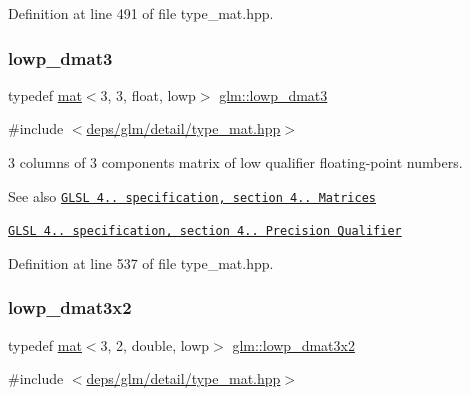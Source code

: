 Definition at line 491 of file type\+\_\+mat.\+hpp.

\mbox{\label{group__core__precision_ga2e700c380867b8d935f2c9ea40c9ca16}} 
\subsubsection{\texorpdfstring{lowp\+\_\+dmat3}{lowp\_dmat3}}
{\footnotesize\ttfamily typedef \hyperlink{structglm_1_1mat}{mat}$<$3, 3, float, lowp$>$ \hyperlink{group__core__precision_ga2e700c380867b8d935f2c9ea40c9ca16}{glm\+::lowp\+\_\+dmat3}}



{\ttfamily \#include $<$\hyperlink{type__mat_8hpp}{deps/glm/detail/type\+\_\+mat.\+hpp}$>$}

3 columns of 3 components matrix of low qualifier floating-\/point numbers.

\begin{DoxySeeAlso}{See also}
\href{http://www.opengl.org/registry/doc/GLSLangSpec.4.20.8.pdf}{\tt G\+L\+SL 4.. specification, section 4.. Matrices} 

\href{http://www.opengl.org/registry/doc/GLSLangSpec.4.20.8.pdf}{\tt G\+L\+SL 4.. specification, section 4.. Precision Qualifier} 
\end{DoxySeeAlso}


Definition at line 537 of file type\+\_\+mat.\+hpp.

\mbox{\label{group__core__precision_gae774d40dc418c39f5ef4dcf4deac0e3c}} 
\subsubsection{\texorpdfstring{lowp\+\_\+dmat3x2}{lowp\_dmat3x2}}
{\footnotesize\ttfamily typedef \hyperlink{structglm_1_1mat}{mat}$<$3, 2, double, lowp$>$ \hyperlink{group__core__precision_gae774d40dc418c39f5ef4dcf4deac0e3c}{glm\+::lowp\+\_\+dmat3x2}}



{\ttfamily \#include $<$\hyperlink{type__mat_8hpp}{deps/glm/detail/type\+\_\+mat.\+hpp}$>$}

